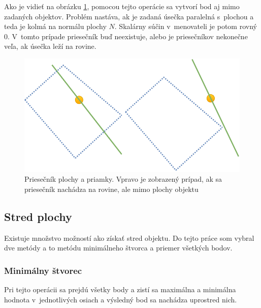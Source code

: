Ako je vidieť na obrázku \ref{fig:GraphIntersection_Plane_Line}, pomocou tejto operácie sa vytvorí bod aj mimo zadaných objektov. Problém nastáva, ak je zadaná úsečka paralelná s~plochou a teda je kolmá na normálu plochy $N$. Skalárny súčin v~menovateli je potom rovný 0. V~tomto prípade priesečník buď neexistuje, alebo je priesečníkov nekonečne veľa, ak úsečka leží na rovine.

\begin{figure}[H]
	\centering
	\includegraphics[height=0.3\textwidth]{obrazky-figures/Diagram/Draw/1Points/DP Navrh operacii-0D - PointIntersectionPlaneLine.pdf}
	\caption{Priesečník plochy a priamky. Vpravo je zobrazený prípad, ak sa priesečník nachádza na rovine, ale mimo plochy objektu}
	\label{fig:GraphIntersection_Plane_Line}
\end{figure}

\subsection*{Stred plochy}
Existuje množstvo možností ako získať stred objektu. Do tejto práce som vybral dve metódy a to metódu minimálneho štvorca a priemer všetkých bodov. %


\subsubsection{Minimálny štvorec}
Pri tejto operácii sa prejdú všetky body a zistí sa maximálna a minimálna hodnota v~jednotlivých osiach a výsledný bod sa nachádza uprostred nich.


